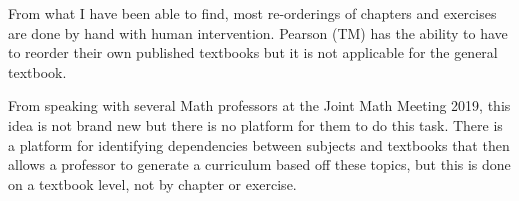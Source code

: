 From what I have been able to find, most re-orderings of chapters and exercises are done by hand with human intervention. Pearson (TM) has the ability to have to reorder their own published textbooks but it is not applicable for the general textbook.

From speaking with several Math professors at the Joint Math Meeting 2019, this idea is not brand new but there is no platform for them to do this task. There is a platform for identifying dependencies between subjects and textbooks that then allows a professor to generate a curriculum based off these topics, but this is done on a textbook level, not by chapter or exercise.





